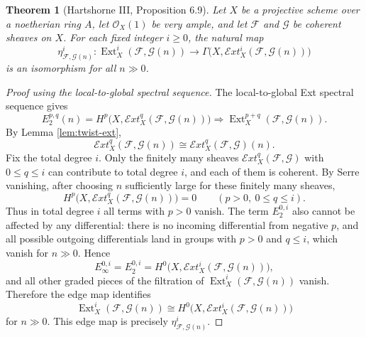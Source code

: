 \documentclass[11pt,a4paper]{article}
\numberwithin{equation}{section}
\theoremstyle{plain}
\newtheorem{theorem}{Theorem}[section]
\theoremstyle{definition}
\theoremstyle{remark}
\newcommand{\OO}{\mathcal O}
\newcommand{\F}{\mathcal F}
\newcommand{\G}{\mathcal G}
\DeclareMathOperator{\Ext}{Ext}
\newcommand{\sExt}{\mathcal{E}\!xt}
\begin{document}
\begin{theorem}[Hartshorne III, Proposition 6.9]\label{thm:hartshorne-6-9}
Let \(X\) be a projective scheme over a noetherian ring \(A\), let \(\OO_X(1)\) be very ample, and let \(\F\) and \(\G\) be coherent sheaves on \(X\).  For each fixed integer \(i\ge0\), the natural map
\[
  \eta_{\F,\G(n)}^i:
  \Ext_X^i(\F,\G(n))
  \longrightarrow
  \Gamma\bigl(X,\sExt_X^i(\F,\G(n))\bigr)
\]
is an isomorphism for all \(n\gg0\).
\end{theorem}

\begin{proof}[Proof using the local-to-global spectral sequence]
The local-to-global Ext spectral sequence gives
\[
  E_2^{p,q}(n)
  =H^p\bigl(X,\sExt_X^q(\F,\G(n))\bigr)
  \Longrightarrow
  \Ext_X^{p+q}(\F,\G(n)).
\]
By Lemma \ref{lem:twist-ext},
\[
  \sExt_X^q(\F,\G(n))
  \cong
  \sExt_X^q(\F,\G)(n).
\]
Fix the total degree \(i\).  Only the finitely many sheaves \(\sExt_X^q(\F,\G)\) with \(0\le q\le i\) can contribute to total degree \(i\), and each of them is coherent.  By Serre vanishing, after choosing \(n\) sufficiently large for these finitely many sheaves,
\[
  H^p\bigl(X,\sExt_X^q(\F,\G(n))\bigr)=0
  \qquad(p>0,\ 0\le q\le i).
\]
Thus in total degree \(i\) all terms with \(p>0\) vanish.  The term \(E_2^{0,i}\) also cannot be affected by any differential: there is no incoming differential from negative \(p\), and all possible outgoing differentials land in groups with \(p>0\) and \(q\le i\), which vanish for \(n\gg0\).  Hence
\[
  E_\infty^{0,i}=E_2^{0,i}
  =H^0\bigl(X,\sExt_X^i(\F,\G(n))\bigr),
\]
and all other graded pieces of the filtration of \(\Ext_X^i(\F,\G(n))\) vanish.  Therefore the edge map identifies
\[
  \Ext_X^i(\F,\G(n))
  \cong
  H^0\bigl(X,\sExt_X^i(\F,\G(n))\bigr)
\]
for \(n\gg0\).  This edge map is precisely \(\eta_{\F,\G(n)}^i\).
\end{proof}
\end{document}
